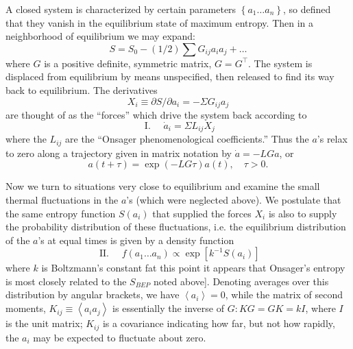 \documentclass{article}
\begin{document}
A closed system is characterized by certain parameters $\left\{a_1 \ldots a_n\right\}$, so defined that they vanish in the equilibrium state of maximum entropy. Then in a neighborhood of equilibrium we may expand:
\begin{equation}
S=S_0-(1 / 2) \sum G_{i j} a_i a_j+\ldots \label{eq-onsagers-eq}
\end{equation}
where $G$ is a positive definite, symmetric matrix, $G=G^\top$. The system is displaced from equilibrium by means unspecified, then released to find its way back to equilibrium. The derivatives
\begin{equation}
X_i \equiv \partial S / \partial a_i=-\Sigma G_{i j} a_j \label{eq-the-derivatives}
\end{equation}
are thought of as the ``forces'' which drive the system back according to
\begin{equation}
\text { I. } \quad \dot{a}_i=\Sigma L_{i j} X_j
\end{equation}
where the $L_{i j}$ are the ``Onsager phenomenological coefficients.'' Thus the $a$'s relax to zero along a trajectory given in matrix notation by $\dot{a}=-L G a$, or
\begin{equation}
a(t+\tau)=\exp (-L G \tau) a(t), \quad \tau>0. \label{eq-coefficient-relax}
\end{equation}

Now we turn to situations very close to equilibrium and examine the small thermal fluctuations in the $a$'s (which were neglected above). We postulate that the same entropy function $S\left(a_i\right)$ that supplied the forces $X_i$ is also to supply the probability distribution of these fluctuations, i.e. the equilibrium distribution of the $a$'s at equal times is given by a density function
\begin{equation}
\text { II. } \quad f\left(a_1 \ldots a_n\right) \propto \exp \left[k^{-1} S\left(a_i\right)\right] \label{eq-equilibrium-density}
\end{equation}
where $k$ is Boltzmann's constant fat this point it appears that Onsager's entropy is most closely related to the $S_{B E P}$ noted above]. Denoting averages over this distribution by angular brackets, we have $\left\langle a_i\right\rangle=0$, while the matrix of second moments, $K_{i j} \equiv\left\langle a_i a_j\right\rangle$ is essentially the inverse of $G: K G=G K=k I$, where $I$ is the unit matrix; $K_{i j}$ is a covariance indicating how far, but not how rapidly, the $a_i$ may be expected to fluctuate about zero.
\end{document}
